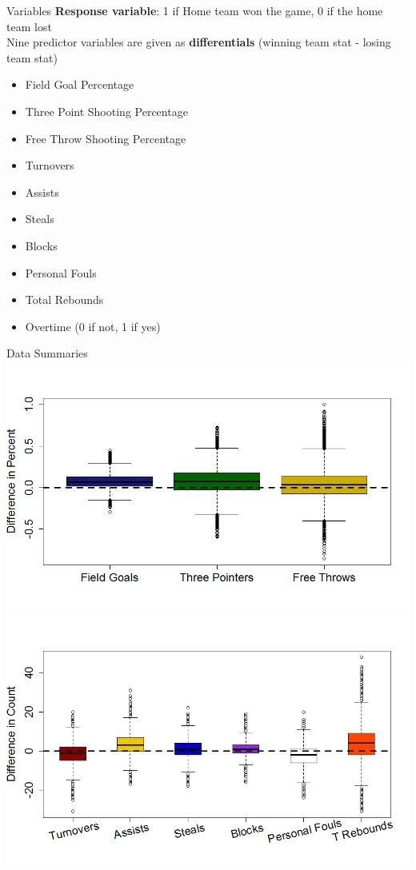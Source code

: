 \documentclass{beamer}
\begin{document}
\begin{frame}{Variables}
\textbf{Response variable}: 1 if Home team won the game, 0 if the home team lost\\
Nine predictor variables are given as \textbf{differentials} (winning team stat - losing team stat) 

	\begin{multicols}{2}
		
	\begin{itemize}
		\item Field Goal Percentage
		\item Three Point Shooting Percentage
		\item Free Throw Shooting Percentage
		\item Turnovers
		\item Assists
		\item Steals
		\item Blocks
		\item Personal Fouls
		\item Total Rebounds
		\item Overtime (0 if not, 1 if yes)
	\end{itemize}
	
\end{multicols}


\end{frame}

\begin{frame}{Data Summaries}
	\centering
	\includegraphics[height=.45\textheight]{percentbox.jpeg}\\
	\vspace{-14pt}
	\includegraphics[height=.5\textheight]{diffbox.jpeg}
\end{frame}
\end{document}
